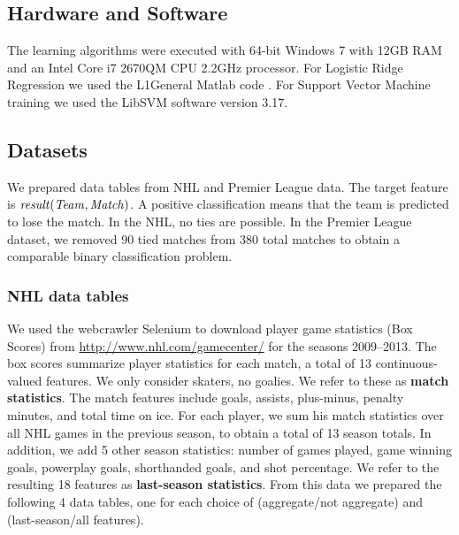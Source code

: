 \documentclass[oribibl]{llncs}%
\begin{document}
\subsection{Hardware and Software} The learning algorithms were executed with 64-bit Windows 7 with 12GB RAM and an Intel Core i7 2670QM CPU 2.2GHz processor. For Logistic Ridge Regression we used the L1General Matlab code \cite{bib:l1general}. For Support Vector Machine training we used the LibSVM software version 3.17.


\subsection{Datasets}

We prepared data tables from NHL and Premier League data. The target feature is $\it{result(Team,Match)}$. A positive classification means that the team is predicted to lose the match. In the NHL, no ties are possible. In the Premier League dataset, we removed 90 tied matches from 380 total matches to obtain a comparable binary classification problem.

\subsubsection{NHL data tables}

We used the webcrawler Selenium \cite{bib:crawler} to download player game statistics (Box Scores) from \url{http://www.nhl.com/gamecenter/} for the seasons 2009--2013. The box scores summarize player statistics for each match, a total of 13 continuous-valued features. We only consider skaters, no goalies. We refer to these as \textbf{match statistics}. The match features include goals, assists, plus-minus, penalty minutes, and total time on ice. For each player, we sum his match statistics over all NHL games in the previous season, to obtain a total of 13 season totals. In addition, we add 5 other season statistics: number of games played, game winning goals, powerplay goals, shorthanded goals, and shot percentage. We refer to the resulting 18 features as \textbf{last-season statistics}. From this data we prepared the following 4 data tables, one for each choice of (aggregate/not aggregate) and (last-season/all features).
\end{document}
